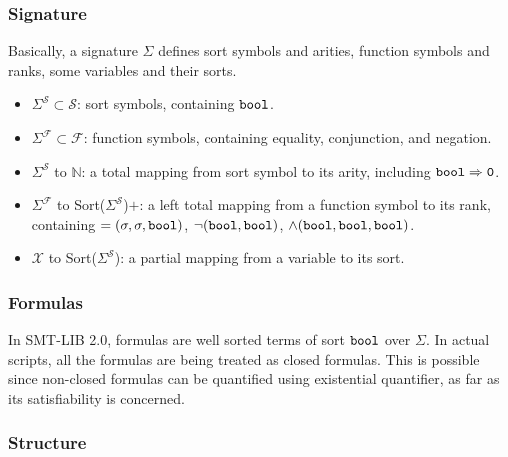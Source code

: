 \documentclass[10pt,letter]{article}
\theoremstyle{definition}
\begin{document}
\subsubsection{Signature}

Basically, a signature $\Sigma$ defines sort symbols and arities, function symbols and ranks, some variables and their sorts.

\begin{itemize}
\item $\Sigma^\mathcal{S} \subset \mathcal{S}$: sort symbols, containing $\tt bool$.
\item $\Sigma^\mathcal{F} \subset \mathcal{F}$: function symbols, containing equality, conjunction, and negation.
\item $\Sigma^\mathcal{S}$ to $\mathbb{N}$: a total mapping from sort symbol to its arity, including $\tt bool \Rightarrow 0$.
\item $\Sigma^\mathcal{F}$ to Sort($\Sigma^\mathcal{S}$)$+$: a left total mapping from a function symbol to its rank, containing $=(\sigma, \sigma, {\tt bool} )$, $\neg({\tt bool},{\tt bool})$, $\wedge ({\tt bool}, {\tt bool}, {\tt bool})$.
\item $\mathcal{X}$ to Sort($\Sigma^\mathcal{S}$): a partial mapping from a variable to its sort.
\end{itemize}

\subsubsection{Formulas}

In SMT-LIB 2.0, formulas are well sorted terms of sort $\tt bool$ over $\Sigma$. In actual scripts, all the formulas are being treated as closed formulas. This is possible since non-closed formulas can be quantified using existential quantifier, as far as its satisfiability is concerned.

\subsubsection{Structure}
\end{document}
